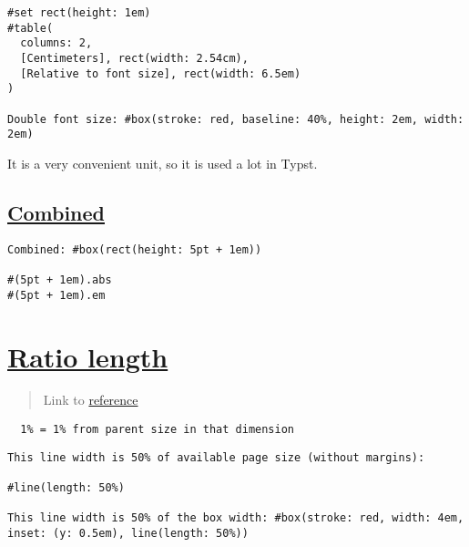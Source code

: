 \begin{verbatim}
#set rect(height: 1em)
#table(
  columns: 2,
  [Centimeters], rect(width: 2.54cm),
  [Relative to font size], rect(width: 6.5em)
)

Double font size: #box(stroke: red, baseline: 40%, height: 2em, width: 2em)
\end{verbatim}

\pandocbounded{}

It is a very convenient unit, so it is used a lot in Typst.

\subsection{\texorpdfstring{\hyperref[combined]{Combined}}{Combined}}\label{combined}

\begin{verbatim}
Combined: #box(rect(height: 5pt + 1em))

#(5pt + 1em).abs
#(5pt + 1em).em
\end{verbatim}

\pandocbounded{}

\section{\texorpdfstring{\hyperref[ratio-length]{Ratio
length}}{Ratio length}}\label{ratio-length}

\begin{quote}
Link to \href{https://typst.app/docs/reference/layout/ratio/}{reference}
\end{quote}

\texttt{\ }{\texttt{\ 1\%\ =\ 1\%\ from\ parent\ size\ in\ that\ dimension\ }}\texttt{\ }

\begin{verbatim}
This line width is 50% of available page size (without margins):

#line(length: 50%)

This line width is 50% of the box width: #box(stroke: red, width: 4em, inset: (y: 0.5em), line(length: 50%))
\end{verbatim}

\pandocbounded{}

